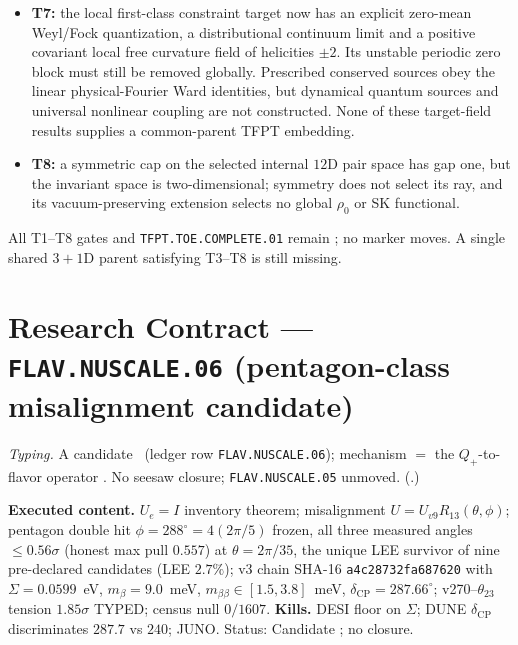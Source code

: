 \begin{itemize}
  link truncation and full $192$-mode site character), but give no canonical
  compatible clock family or neutrino mass texture. The symmetric candidate
  forbids every Majorana bilinear.
\item \textbf{T7:} the local first-class constraint target now has an explicit
  zero-mean Weyl/Fock quantization, a distributional continuum limit and a
  positive covariant local free curvature field of helicities $\pm2$.
  Its unstable periodic zero block must still be removed globally.
  Prescribed conserved sources obey the linear physical-Fourier Ward
  identities, but dynamical quantum sources and universal nonlinear
  coupling are not constructed. None of these target-field results
  supplies a common-parent TFPT embedding.
\item \textbf{T8:} a symmetric cap on the selected internal $12$D pair space has gap one, but the
  invariant space is two-dimensional; symmetry does not select its ray,
  and its vacuum-preserving extension selects no global $\rho_0$ or SK functional.
\end{itemize}
All T1--T8 gates and \texttt{TFPT.TOE.COMPLETE.01} remain \mO; no marker moves.
A single shared $3{+}1$D parent satisfying T3--T8 is still missing.







\section*{Research Contract --- \texttt{FLAV.NUSCALE.06} (pentagon-class misalignment candidate)}
\noindent\emph{Typing.} A candidate \mC\ (ledger row \texttt{FLAV.NUSCALE.06}); mechanism $=$
the $Q_+$-to-flavor operator \mO.  No seesaw closure; \texttt{FLAV.NUSCALE.05} unmoved.
(.)

\par\smallskip\noindent\textbf{Executed content.}  $U_e=I$ inventory theorem; misalignment
$U=U_{v9}R_{13}(\theta,\phi)$; pentagon double hit $\phi=288^\circ=4(2\pi/5)$ frozen, all three
measured angles $\le0.56\sigma$ (honest max pull $0.557$) at $\theta=2\pi/35$, the unique LEE
survivor of nine pre-declared candidates (LEE $2.7\%$); v3 chain SHA-16
\texttt{a4c28732fa687620} with $\Sigma=0.0599$~eV, $m_\beta=9.0$~meV,
$m_{\beta\beta}\in[1.5,3.8]$~meV, $\delta_{\mathrm{CP}}=287.66^\circ$; v270--$\theta_{23}$
tension $1.85\sigma$ TYPED; census null $0/1607$.
\textbf{Kills.} DESI floor on $\Sigma$; DUNE $\delta_{\mathrm{CP}}$ discriminates $287.7$ vs
$240$; JUNO.  Status: Candidate \mC; no closure.

